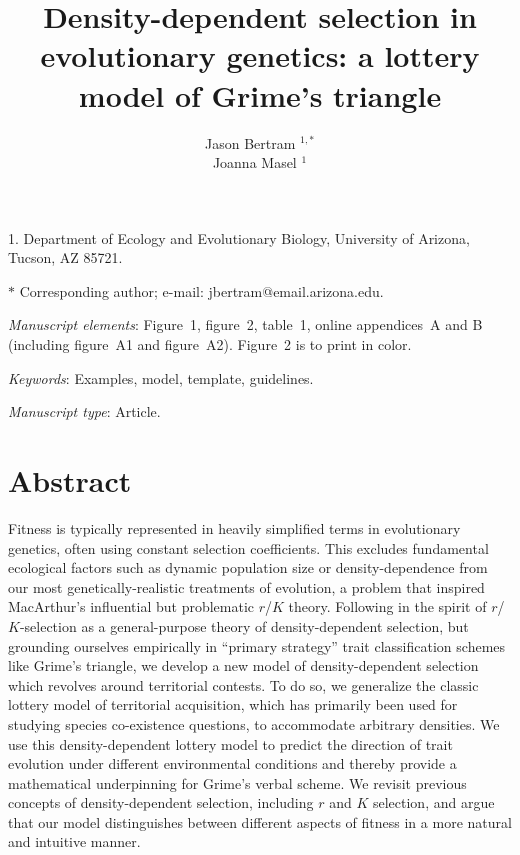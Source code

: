 \documentclass[11pt]{article}
\title{Density-dependent selection in evolutionary genetics: a lottery model of Grime's triangle}
\author{Jason Bertram $^{1,\ast}$ \\ 
Joanna Masel $^{1}$}
\date{}
\begin{document}
\maketitle

\noindent{}1. Department of Ecology and Evolutionary Biology, University of Arizona, Tucson, AZ 85721.

\noindent{}$\ast$ Corresponding author; e-mail: jbertram@email.arizona.edu.


\bigskip

\textit{Manuscript elements}: Figure~1, figure~2, table~1, online
appendices~A and B (including figure~A1 and figure~A2). Figure~2 is to
print in color.

\bigskip

\textit{Keywords}: Examples, model, template, guidelines.

\bigskip

\textit{Manuscript type}: Article. 

\bigskip


\linenumbers{}
\modulolinenumbers[3]

\newpage{}

\section*{Abstract}

Fitness is typically represented in heavily simplified terms in evolutionary genetics, often using constant selection coefficients. This excludes fundamental ecological factors such as dynamic population size or density-dependence from our most genetically-realistic treatments of evolution, a problem that inspired MacArthur's influential but problematic $r$/$K$ theory. Following in the spirit of $r$/$K$-selection as a general-purpose theory of density-dependent selection, but grounding ourselves empirically in ``primary strategy'' trait classification schemes like Grime's triangle, we develop a new model of density-dependent selection which revolves around territorial contests. To do so, we generalize the classic lottery model of territorial acquisition, which has primarily been used for studying species co-existence questions, to accommodate arbitrary densities. We use this density-dependent lottery model to predict the direction of trait evolution under different environmental conditions and thereby provide a mathematical underpinning for Grime's verbal scheme. We revisit previous concepts of density-dependent selection, including $r$ and $K$ selection, and argue that our model distinguishes between different aspects of fitness in a more natural and intuitive manner.
\end{document}

